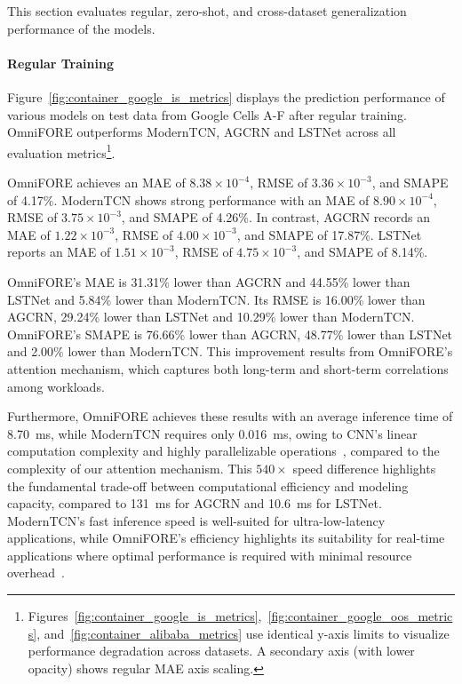 This section evaluates regular, zero-shot, and cross-dataset generalization performance of the models.

\paragraph{Regular Training}
Figure~\ref{fig:container_google_is_metrics} displays the prediction performance of various models on test data from Google Cells A-F after regular training. \ac{OmniFORE} outperforms \ac{ModernTCN}, \ac{AGCRN} and \ac{LSTNet} across all evaluation metrics\footnote{ Figures~\ref{fig:container_google_is_metrics},~\ref{fig:container_google_oos_metrics}, and~\ref{fig:container_alibaba_metrics} use identical y-axis limits to visualize performance degradation across datasets. A secondary axis (with lower opacity) shows regular \ac{MAE} axis scaling.}.

\ac{OmniFORE} achieves an \ac{MAE} of $8.38 \times 10^{-4}$, \ac{RMSE} of $3.36 \times 10^{-3}$, and \ac{SMAPE} of 4.17\%. \ac{ModernTCN} shows strong performance with an \ac{MAE} of $8.90 \times 10^{-4}$, \ac{RMSE} of $3.75 \times 10^{-3}$, and \ac{SMAPE} of 4.26\%. In contrast, \ac{AGCRN} records an \ac{MAE} of $1.22 \times 10^{-3}$, \ac{RMSE} of $4.00 \times 10^{-3}$, and \ac{SMAPE} of 17.87\%. \ac{LSTNet} reports an \ac{MAE} of $1.51 \times 10^{-3}$, \ac{RMSE} of $4.75 \times 10^{-3}$, and \ac{SMAPE} of 8.14\%. 

\ac{OmniFORE}'s \ac{MAE} is 31.31\% lower than \ac{AGCRN} and 44.55\% lower than \ac{LSTNet} and 5.84\% lower than \ac{ModernTCN}. Its \ac{RMSE} is 16.00\% lower than \ac{AGCRN}, 29.24\% lower than \ac{LSTNet} and 10.29\% lower than \ac{ModernTCN}. \ac{OmniFORE}'s \ac{SMAPE} is 76.66\% lower than \ac{AGCRN}, 48.77\% lower than \ac{LSTNet} and 2.00\% lower than \ac{ModernTCN}. This improvement results from \ac{OmniFORE}'s attention mechanism, which captures both long-term and short-term correlations among workloads.

Furthermore, \ac{OmniFORE} achieves these results with an average inference time of \SI{8.70}{\milli\second}, while \ac{ModernTCN} requires only \SI{0.016}{\milli\second}, owing to \ac{CNN}'s linear computation complexity and highly parallelizable operations~\cite{ModernTCN}, compared to the complexity of our attention mechanism. This $540\times$ speed difference highlights the fundamental trade-off between computational efficiency and modeling capacity, compared to \SI{131}{\milli\second} for \ac{AGCRN} and \SI{10.6}{\milli\second} for \ac{LSTNet}. \ac{ModernTCN}'s fast inference speed is well-suited for ultra-low-latency applications, while \ac{OmniFORE}'s efficiency highlights its suitability for real-time applications where optimal performance is required with minimal resource overhead~\cite{9500858, 8334540}.

